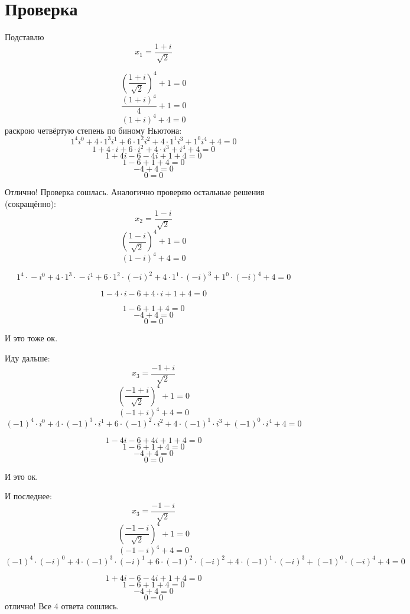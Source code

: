 \documentclass{article}
\begin{document}
\section{Проверка}
Подставлю
$$x_{1}=\frac{ 1+i } {\sqrt{2}}$$

$$\left(\frac{ 1+i } {\sqrt{2}}\right)^4+1=0$$
$$\frac{ (1+i)^4 } {4}+1=0$$
$$(1+i)^4 + 4=0$$
раскрою четвёртую степень по биному Ньютона:
$$1^4{}i^0 + 4\cdot{}1^3{}i^1 + 6\cdot{}1^2{}i^2 + 4\cdot{}1^1{}i^3 + 1^0{}i^4 + 4=0$$
$$1+4\cdot{}i+6\cdot{}i^2+4\cdot{}i^3+i^4+4=0$$
$$1+4i-6-4i+1+4=0$$
$$1-6+1+4=0$$
$$-4+4=0$$
$$0=0$$

Отлично! Проверка сошлась. Аналогично проверяю остальные решения (сокращённо):
$$x_{2}=\frac{ 1-i } {\sqrt{2}}$$
$$\left(\frac{ 1-i } {\sqrt{2}}\right)^4+1=0$$
$$(1-i)^4+4=0$$

$$1^4\cdot{}-i^0 + 4\cdot{}1^3\cdot{}-i^1 + 6\cdot{}1^2\cdot{}(-i)^2 + 4\cdot{}1^1\cdot{}(-i)^3+1^0\cdot{}(-i)^4+4=0$$

$$1-4\cdot{}i-6+4\cdot{}i+1+4=0$$

$$1-6+1+4=0$$
$$-4+4=0$$
$$0=0$$

И это тоже ок.

Иду дальше:
$$x_{3}=\frac{ -1+i } {\sqrt{2} }$$
$$\left(\frac{ -1+i } {\sqrt{2}}\right)^4+1=0$$
$$(-1+i)^4+4=0$$
$$(-1)^4\cdot{}i^0 + 4\cdot{}(-1)^3\cdot{}i^1 +6\cdot{}(-1)^2\cdot{}i^2 + 4\cdot{}(-1)^1\cdot{}i^3 + (-1)^0\cdot{}i^4 + 4=0$$

$$1-4{}i-6+4{}i+1+4=0$$
$$1-6+1+4=0$$
$$-4+4=0$$
$$0=0$$

И это ок.

И последнее:
$$x_{3}=\frac{ -1-i } {\sqrt{2} }$$
$$\left(\frac{ -1-i } {\sqrt{2}}\right)^4+1=0$$
$$(-1-i)^4+4=0$$
$$(-1)^4\cdot{}(-i)^0 + 4\cdot{}(-1)^3\cdot{}(-i)^1 + 6\cdot{}(-1)^2\cdot{}(-i)^2 + 4\cdot{}(-1)^1\cdot{}(-i)^3+ (-1)^0\cdot{}(-i)^4 + 4 = 0$$

$$1+4i-6-4i+1+4=0$$
$$1-6+1+4=0$$
$$-4+4=0$$
$$0=0$$
отлично! Все 4 ответа сошлись.
\end{document}

